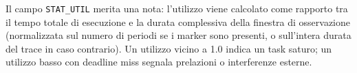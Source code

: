 	Il campo \texttt{STAT\_UTIL} merita una nota: l'utilizzo viene calcolato come
	rapporto tra il tempo totale di esecuzione e la durata complessiva della
	finestra di osservazione (normalizzata sul numero di periodi se i marker sono
	presenti, o sull'intera durata del trace in caso contrario). Un utilizzo vicino
	a 1.0 indica un task saturo; un utilizzo basso con deadline miss segnala
	prelazioni o interferenze esterne.
	
	\clearpage
	
	
	
	
	
	
	\clearpage
